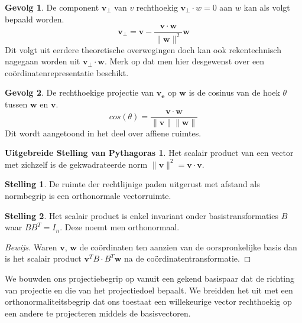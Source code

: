 \documentclass{amsart}
\theoremstyle{definition}
\newtheorem{thm}{Stelling}[section]
\newtheorem{csq}{Gevolg}[section]
\newenvironment{bewijs}{\begin{proof}[Bewijs]}{\end{proof}}
\newcommand{\norm}[1]{\lVert{#1}\rVert}
\newcommand{\vvec}[1][v]{\mathbf{#1}}
\newcommand{\uvec}[1][v]{\vvec[#1]_\mathbf{e}}
\newcommand{\vnorm}[1]{\norm{\vvec[#1]}}
\begin{document}
\begin{csq}
    De component $\vvec[v]_\perp$ van $v$ rechthoekig $\vvec[v]_\perp \cdot w = 0$ aan $w$ kan als volgt bepaald worden.
    \begin{equation*}
        \vvec[v]_\perp = \vvec - \frac{\vvec\cdot\vvec[w]}{\vnorm w^2}\vvec[w]
    \end{equation*}
    Dit volgt uit eerdere theoretische overwegingen doch kan ook rekentechnisch nagegaan worden uit $\vvec[v]_\perp\cdot\vvec[w]$.
    Merk op dat men hier desgewenst over een coördinatenrepresentatie beschikt.
\end{csq}

\begin{csq}
    De rechthoekige projectie van $\uvec$ op $\vvec[w]$ is de cosinus van de hoek $\theta$ tussen $\vvec[w]$ en $\vvec$.
    \begin{equation*}
        cos(\theta) = \frac{\vvec \cdot \vvec[w]}{\vnorm v\vnorm w}
    \end{equation*}
    Dit wordt aangetoond in het deel over affiene ruimtes.
\end{csq}

\newtheorem*{pyth}{Uitgebreide Stelling van Pythagoras}
\begin{pyth}
    Het scalair product van een vector met zichzelf is de gekwadrateerde norm $\vnorm v^2 = \vvec\cdot\vvec$.
\end{pyth}

\begin{thm}
    De ruimte der rechtlijnige paden uitgerust met afstand als normbegrip is een orthonormale vectorruimte.
\end{thm}

\begin{thm}
    Het scalair product is enkel invariant onder basistransformaties $B$ waar $BB^T=I_n$. Deze noemt men orthonormaal.
    \begin{bewijs}
        Waren $\vvec$, $\vvec[w]$ de coördinaten ten aanzien van de oorspronkelijke basis dan is het scalair product $\vvec^T B\cdot B^T\vvec[w]$ na de coördinatentransformatie.
    \end{bewijs}
\end{thm}

We bouwden ons projectiebegrip op vanuit een gekend basispaar dat de richting van projectie en die van het projectiedoel bepaalt.
We breidden het uit met een orthonormaliteitsbegrip dat ons toestaat een willekeurige vector rechthoekig op een andere te projecteren middels de basisvectoren.
\end{document}
